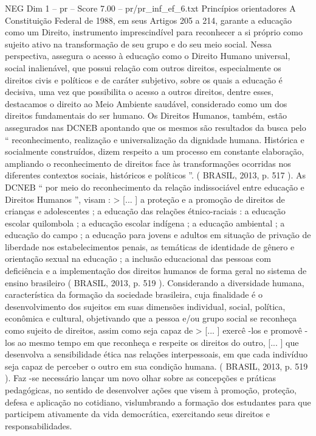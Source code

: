 \begin{textsample}{NEG Dim 1 – pr – Score 7.00 – pr/pr\_inf\_ef\_6.txt}  \label{ex:f1_neg_264}
Princípios orientadores A Constituição Federal de 1988, em seus Artigos 205 a 214, garante a educação como um Direito, instrumento imprescindível para reconhecer a si próprio como sujeito ativo na transformação de seu grupo e do seu meio social.
Nessa perspectiva, assegura o acesso à educação como o Direito Humano universal, social inalienável, que possui relação com outros direitos, especialmente os direitos civis e políticos e de caráter subjetivo, sobre os quais a educação é decisiva, uma vez que possibilita o acesso a outros direitos, dentre esses, destacamos o direito ao Meio Ambiente saudável, considerado como um dos direitos fundamentais do ser humano.
Os Direitos Humanos, também, estão assegurados nas DCNEB apontando que os mesmos são resultados da busca pelo “ reconhecimento, realização e universalização da dignidade humana.
Histórica e socialmente construídos, dizem respeito a um processo em constante elaboração, ampliando o reconhecimento de direitos face às transformações ocorridas nos diferentes contextos sociais, históricos e políticos ”. ( BRASIL, 2013, p. 517 ).
As DCNEB “ por meio do reconhecimento da relação indissociável entre educação e Direitos Humanos ”, visam : > [... ] a proteção e a promoção de direitos de crianças e adolescentes ; a educação das relações étnico-raciais : a educação escolar quilombola ; a educação escolar indígena ; a educação ambiental ; a educação do campo ; a educação para jovens e adultos em situação de privação de liberdade nos estabelecimentos penais, as temáticas de identidade de gênero e orientação sexual na educação ; a inclusão educacional das pessoas com deficiência e a implementação dos direitos humanos de forma geral no sistema de ensino brasileiro ( BRASIL, 2013, p. 519 ).
Considerando a diversidade humana, característica da formação da sociedade brasileira, cuja finalidade é o desenvolvimento dos sujeitos em suas dimensões individual, social, política, econômica e cultural, objetivando que a pessoa e/ou grupo social se reconheça como sujeito de direitos, assim como seja capaz de > [... ] exercê -los e promovê -los ao mesmo tempo em que reconheça e respeite os direitos do outro, [... ] que desenvolva a sensibilidade ética nas relações interpessoais, em que cada indivíduo seja capaz de perceber o outro em sua condição humana. ( BRASIL, 2013, p. 519 ).
Faz -se necessário lançar um novo olhar sobre as concepções e práticas pedagógicas, no sentido de desenvolver ações que visem à promoção, proteção, defesa e aplicação no cotidiano, vislumbrando a formação dos estudantes para que participem ativamente da vida democrática, exercitando seus direitos e responsabilidades.

\end{textsample}
